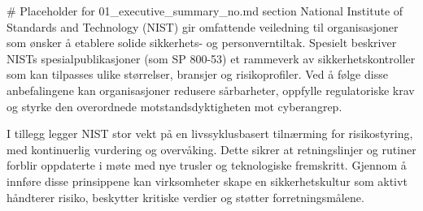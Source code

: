 # Placeholder for 01_executive_summary_no.md section
National Institute of Standards and Technology (NIST) gir omfattende veiledning til organisasjoner som ønsker å etablere solide sikkerhets- og personverntiltak. Spesielt beskriver NISTs spesialpublikasjoner (som SP 800-53) et rammeverk av sikkerhetskontroller som kan tilpasses ulike størrelser, bransjer og risikoprofiler. Ved å følge disse anbefalingene kan organisasjoner redusere sårbarheter, oppfylle regulatoriske krav og styrke den overordnede motstandsdyktigheten mot cyberangrep.

I tillegg legger NIST stor vekt på en livssyklusbasert tilnærming for risikostyring, med kontinuerlig vurdering og overvåking. Dette sikrer at retningslinjer og rutiner forblir oppdaterte i møte med nye trusler og teknologiske fremskritt. Gjennom å innføre disse prinsippene kan virksomheter skape en sikkerhetskultur som aktivt håndterer risiko, beskytter kritiske verdier og støtter forretningsmålene.